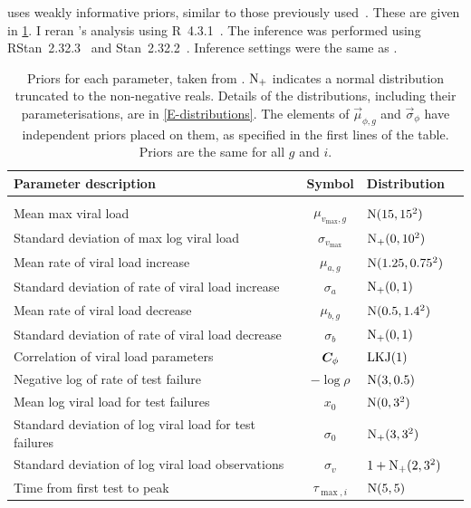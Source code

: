 \documentclass[thesis.tex]{subfiles}
\begin{document}
\textcite{hakkiOnset} uses weakly informative priors, similar to those previously used~\autocite{singanayagamCommunity}.
These are given in \cref{ATACCC:table:hakki-priors}.
I reran \textcite{hakkiOnset}'s analysis using R~4.3.1~\autocite{R-4-3-1}.
The inference was performed using RStan~2.32.3~\autocite{RStan-2-32-3} and Stan~2.32.2~\autocite{Stan-2-32-2}.
Inference settings were the same as \textcite{hakkiOnset}.
\begin{table}
\begin{tabular}{l c l l}
    Parameter description & Symbol & Distribution \\
    \hline \\
    Mean max viral load & $\mu_{v_\text{max}, g}$ & $\operatorname{N}(15, 15^2)$ \\
    Standard deviation of max log viral load & $\sigma_{v_\text{max}}$ & $\operatorname{N}_+(0, 10^2)$ \\
    Mean rate of viral load increase & $\mu_{a, g}$ & $\operatorname{N}(1.25, 0.75^2)$ \\
    Standard deviation of rate of viral load increase & $\sigma_{a}$ & $\operatorname{N}_+(0, 1)$ \\
    Mean rate of viral load decrease & $\mu_{b, g}$ & $\operatorname{N}(0.5, 1.4^2)$ \\
    Standard deviation of rate of viral load decrease & $\sigma_{b}$ & $\operatorname{N}_+(0, 1)$ \\
    Correlation of viral load parameters & $\bm{C}_\phi$ & $\operatorname{LKJ}(1)$ \\
    Negative log of rate of test failure & $-\log \rho$ & $\operatorname{N}(3, 0.5)$ \\
    Mean log viral load for test failures & $x_0$ & $\operatorname{N}(0, 3^2)$ \\
    Standard deviation of log viral load for test failures & $\sigma_0$ & $\operatorname{N}_+(3, 3^2)$ \\
    Standard deviation of log viral load observations & $\sigma_v$ & $1 + \operatorname{N}_+(2, 3^2)$ \\
    Time from first test to peak & $\tau_{\max,i}$ & $\operatorname{N}(5,5)$
\end{tabular}
\caption[Viral load model priors]{Priors for each parameter, taken from \textcite{hakkiOnset}. $\operatorname{N}_+$ indicates a normal distribution truncated to the non-negative reals. Details of the distributions, including their parameterisations, are in \cref{E-distributions}. The elements of $\vec{\mu}_{\phi,g}$ and $\vec{\sigma}_\phi$ have independent priors placed on them, as specified in the first lines of the table. Priors are the same for all $g$ and $i$. \label{ATACCC:table:hakki-priors}}
\end{table}
\end{document}
